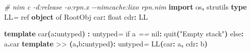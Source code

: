 \documentclass[
  12pt,
]{book}
\newenvironment{Shaded}{}{}
\newcommand{\CommentTok}[1]{\textcolor[rgb]{0.38,0.63,0.69}{\textit{#1}}}
\newcommand{\DataTypeTok}[1]{\textcolor[rgb]{0.56,0.13,0.00}{#1}}
\newcommand{\FloatTok}[1]{\textcolor[rgb]{0.25,0.63,0.44}{#1}}
\newcommand{\KeywordTok}[1]{\textcolor[rgb]{0.00,0.44,0.13}{\textbf{#1}}}
\newcommand{\NormalTok}[1]{#1}
\newcommand{\StringTok}[1]{\textcolor[rgb]{0.25,0.44,0.63}{#1}}
\begin{document}
\begin{Shaded}
\begin{Highlighting}[]
\CommentTok{\# nim c {-}d:release {-}o:rpn.x {-}{-}nimcache:lixo rpn.nim}
\KeywordTok{import}\NormalTok{ os}\KeywordTok{,}\NormalTok{ strutils}
\KeywordTok{type }\DataTypeTok{LL}\CommentTok{=} \DataTypeTok{ref} \KeywordTok{object }\DataTypeTok{of}\CommentTok{ }\DataTypeTok{RootObj}
\NormalTok{    car}\KeywordTok{:} \DataTypeTok{float}
\NormalTok{    cdr}\KeywordTok{:} \DataTypeTok{LL}

\KeywordTok{template }\StringTok{car}\KeywordTok{(}\NormalTok{a}\KeywordTok{:}\DataTypeTok{untyped}\KeywordTok{)} \KeywordTok{:} \DataTypeTok{untyped}\CommentTok{=}
  \DataTypeTok{if}\NormalTok{ a }\CommentTok{==} \FloatTok{nil}\KeywordTok{:} \DataTypeTok{quit}\KeywordTok{(}\StringTok{"Empty stack"}\KeywordTok{)}
  \DataTypeTok{else}\KeywordTok{:}\NormalTok{ a}\KeywordTok{.}\DataTypeTok{car}
\KeywordTok{template }\StringTok{\textasciigrave{}\textgreater{}\textgreater{}\textasciigrave{}}\CommentTok{ }\KeywordTok{(}\NormalTok{a}\KeywordTok{,}\NormalTok{b}\KeywordTok{:}\DataTypeTok{untyped}\KeywordTok{):} \DataTypeTok{untyped}\CommentTok{=} \DataTypeTok{LL}\KeywordTok{(}\NormalTok{car}\KeywordTok{:}\NormalTok{ a}\KeywordTok{,}\NormalTok{ cdr}\KeywordTok{:}\NormalTok{ b}\KeywordTok{)}


\end{Highlighting}
\end{Shaded}
\end{document}
